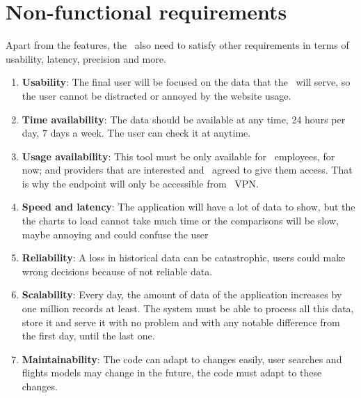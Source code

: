 
\section{Non-functional requirements}

Apart from the features, the \thesis\ also need to satisfy other requirements in terms of usability, latency, precision and more.

\begin{enumerate}
    \item \textbf{Usability}: The final user will be focused on the data that the \thesis\ will serve, so the user cannot be distracted or annoyed by the website usage.
    \\
    \item \textbf{Time availability}: The data should be available at any time, 24 hours per day, 7 days a week. The user can check it at anytime.
    \\
    \item \textbf{Usage availability}: This tool must be only available for \company\ employees, for now; and providers that are interested and \company\ agreed to give them access. That is why the endpoint will only be accessible from \company\ VPN\cite{palo_alto_networks}.
    \\
    \item \textbf{Speed and latency}: The application will have a lot of data to show, but the the charts to load cannot take much time or the comparisons will be slow, maybe annoying and could confuse the user
    \\
    \item \textbf{Reliability}: A loss in historical data can be catastrophic, users could make wrong decisions because of not reliable data.
    \\
    \item \textbf{Scalability}: Every day, the amount of data of the application increases by one million records at least. The system must be able to process all this data, store it and serve it with no problem and with any notable difference from the first day, until the last one.
    \\
    \item \textbf{Maintainability}: The code can adapt to changes easily, user searches and flights models may change in the future, the code must adapt to these changes.
\end{enumerate}

